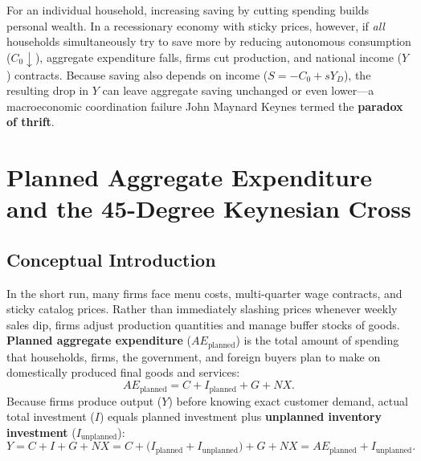 \documentclass[11pt,letterpaper]{article}
\begin{document}
\begin{coreprinciple}
For an individual household, increasing saving by cutting spending builds personal wealth. In a recessionary economy with sticky prices, however, if \emph{all} households simultaneously try to save more by reducing autonomous consumption ($C_0 \downarrow$), aggregate expenditure falls, firms cut production, and national income ($Y$) contracts. Because saving also depends on income ($S = -C_0 + sY_D$), the resulting drop in $Y$ can leave aggregate saving unchanged or even lower—a macroeconomic coordination failure John Maynard Keynes termed the \textbf{paradox of thrift}.
\end{coreprinciple}

\section{Planned Aggregate Expenditure and the 45-Degree Keynesian Cross}

\subsection*{Conceptual Introduction}
In the short run, many firms face menu costs, multi-quarter wage contracts, and sticky catalog prices. Rather than immediately slashing prices whenever weekly sales dip, firms adjust production quantities and manage buffer stocks of goods. \textbf{Planned aggregate expenditure} ($AE_{\text{planned}}$) is the total amount of spending that households, firms, the government, and foreign buyers plan to make on domestically produced final goods and services:
\begin{equation}
AE_{\text{planned}} = C + I_{\text{planned}} + G + NX.
\end{equation}
Because firms produce output ($Y$) before knowing exact customer demand, actual total investment ($I$) equals planned investment plus \textbf{unplanned inventory investment} ($I_{\text{unplanned}}$):
\begin{equation}
Y = C + I + G + NX = C + \bigl(I_{\text{planned}} + I_{\text{unplanned}}\bigr) + G + NX = AE_{\text{planned}} + I_{\text{unplanned}}.
\end{equation}
\end{document}
